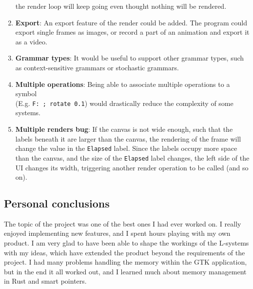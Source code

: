 \documentclass[a4paper]{article}
\begin{document}
\begin{enumerate}
    the render loop will keep going even thought nothing will be rendered.
    \item \textbf{Export}: An export feature of the render could be added. The program could export
    single frames as images, or record a part of an animation and export it as a video.
    \item \textbf{Grammar types}: It would be useful to support other grammar types, such as context-sensitive
    grammars or stochastic grammars.
    \item \textbf{Multiple operations}: Being able to associate multiple operations to a symbol \\
    (E.g. \texttt{F: ; rotate 0.1}) would drastically reduce the complexity of some systems.
    \item \textbf{Multiple renders bug}: If the canvas is not wide enough, such that the labels
    beneath it are larger than the canvas, the rendering of the frame will change the value in the \texttt{Elapsed}
    label. Since the labels occupy more space than the canvas, and the size of the \texttt{Elapsed} label changes,
    the left side of the UI changes its width, triggering another render operation to be called (and so on).
\end{enumerate}

\subsection{Personal conclusions}

The topic of the project was one of the best ones I had ever worked on.
I really enjoyed implementing new features, and I spent hours playing
with my own product.
I am very glad to have been able to shape the workings of the L-systems with my ideas,
which have extended the product beyond the requirements of the project.
I had many problems handling the memory within the \gls{GTK} application,
but in the end it all worked out, and
I learned much about memory management in \gls{Rust} and smart pointers.

\pagebreak
\end{document}
